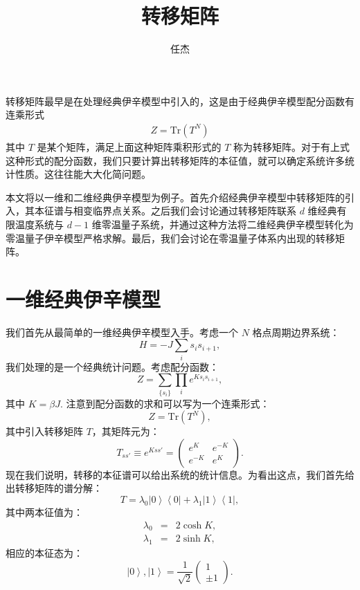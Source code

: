 \documentclass[UTF8]{ctexart}
\begin{document}
\title{转移矩阵}
\author{任杰}
\date{}

\maketitle
\noindent
转移矩阵最早是在处理经典伊辛模型中引入的，这是由于经典伊辛模型配分函数有连乘形式
\begin{eqnarray}
	Z = \mathrm{Tr}(T^N)
\end{eqnarray}
其中 $T$ 是某个矩阵，满足上面这种矩阵乘积形式的 $T$ 称为转移矩阵。对于有上式这种形式的配分函数，我们只要计算出转移矩阵的本征值，就可以确定系统许多统计性质。这往往能大大化简问题。

本文将以一维和二维经典伊辛模型为例子。首先介绍经典伊辛模型中转移矩阵的引入，其本征谱与相变临界点关系。之后我们会讨论通过转移矩阵联系 $d$ 维经典有限温度系统与 $d - 1$ 维零温量子系统，并通过这种方法将二维经典伊辛模型转化为零温量子伊辛模型严格求解。最后，我们会讨论在零温量子体系内出现的转移矩阵。



\section*{一维经典伊辛模型}
\noindent
我们首先从最简单的一维经典伊辛模型入手。考虑一个 $N$ 格点周期边界系统：
\begin{equation}
	H = -J\sum_{i}s_{i}s_{i+1},
\end{equation}
我们处理的是一个经典统计问题。考虑配分函数：
\begin{equation}
	Z = \sum_{\{s_i\} }\prod_{i} e^{K s_{i} s_{i+1}},
\end{equation}
其中 $K=\beta J$. 注意到配分函数的求和可以写为一个连乘形式：
\begin{equation}
	Z = \mathrm{Tr} \left(T^{N}\right),
\end{equation}
其中引入转移矩阵 $T$，其矩阵元为：
\begin{equation}
	T_{ss'} \equiv e^{Kss'} =
	\left(
	\begin{array}{cc}
		e^{ K} & e^{-K} \\
		e^{-K} & e^{ K}
	\end{array}
	\right).
\end{equation}
现在我们说明，转移的本征谱可以给出系统的统计信息。为看出这点，我们首先给出转移矩阵的谱分解：
\begin{equation}
	T=\lambda_{0}\left|0\right\rangle \left\langle 0\right|+\lambda_{1}\left|1\right\rangle \left\langle 1\right|,
\end{equation}
其中两本征值为：
\begin{eqnarray}
	\lambda_0 &=& 2\cosh K, \\
	\lambda_1 &=& 2\sinh K,
\end{eqnarray}
相应的本征态为：
\begin{equation}
	\left|0\right\rangle ,\left|1\right\rangle 
	=\frac{1}{\sqrt{2}}
	\left(
	\begin{array}{c}
		1\\
		\pm1
	\end{array}
	\right).
\end{equation}
\end{document}
